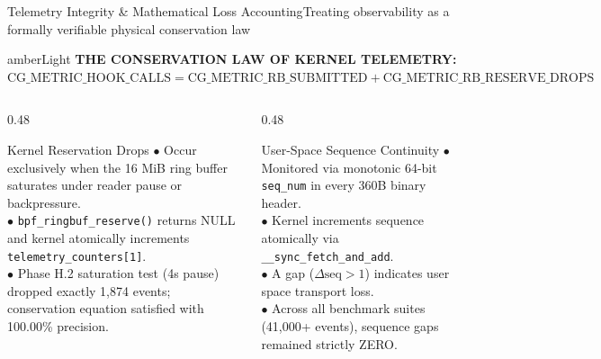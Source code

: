 \documentclass[aspectratio=169,10pt]{beamer}
\begin{document}
\begin{frame}{Telemetry Integrity \& Mathematical Loss Accounting}{Treating observability as a formally verifiable physical conservation law}
  \begin{beamercolorbox}[wd=\textwidth,rounded=true]{amberLight}
    \small \textbf{\textcolor{amberDark}{THE CONSERVATION LAW OF KERNEL TELEMETRY:}}\\[0.1cm]
    \centering
    {\Large \textbf{\textcolor{navyDark}{$\text{CG\_METRIC\_HOOK\_CALLS} = \text{CG\_METRIC\_RB\_SUBMITTED} + \text{CG\_METRIC\_RB\_RESERVE\_DROPS}$}}}
  \end{beamercolorbox}
  \vspace{0.3cm}

  \begin{columns}[T]
    \begin{column}{0.48\textwidth}
      \begin{alertblock}{Kernel Reservation Drops}
        \scriptsize
        $\bullet$ Occur exclusively when the 16 MiB ring buffer saturates under reader pause or backpressure.\\
        $\bullet$ \texttt{bpf\_ringbuf\_reserve()} returns NULL and kernel atomically increments \texttt{telemetry\_counters[1]}.\\
        $\bullet$ Phase H.2 saturation test (4s pause) dropped exactly 1,874 events; conservation equation satisfied with 100.00\% precision.
      \end{alertblock}
    \end{column}

    \begin{column}{0.48\textwidth}
      \begin{block}{User-Space Sequence Continuity}
        \scriptsize
        $\bullet$ Monitored via monotonic 64-bit \texttt{seq\_num} in every 360B binary header.\\
        $\bullet$ Kernel increments sequence atomically via \texttt{\_\_sync\_fetch\_and\_add}.\\
        $\bullet$ A gap ($\Delta\text{seq} > 1$) indicates user space transport loss.\\
        $\bullet$ Across all benchmark suites (41,000+ events), sequence gaps remained strictly ZERO.
      \end{block}
    \end{column}
  \end{columns}
\end{frame}
\end{document}
